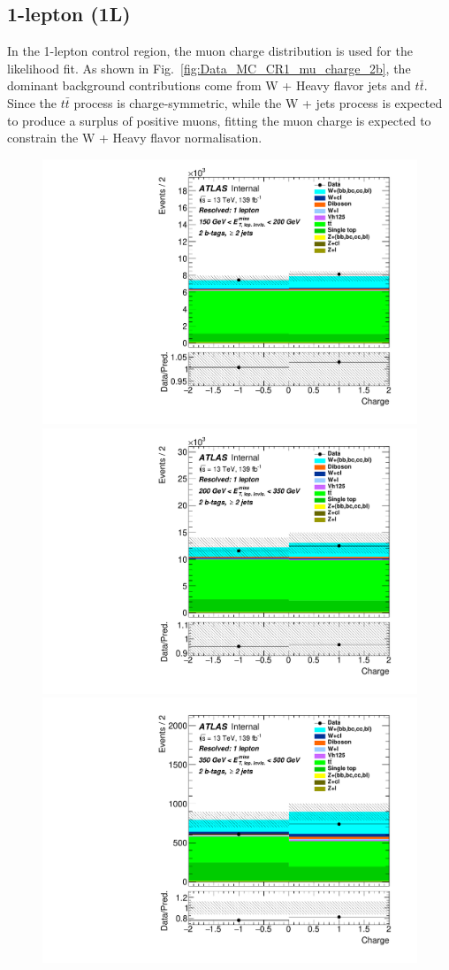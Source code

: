 \subsection{1-lepton (1L)}

\par In the 1-lepton control region, the muon charge distribution is used for the likelihood fit. As shown in Fig.~\ref{fig:Data_MC_CR1_mu_charge_2b}, the
dominant background contributions come from W + Heavy flavor jets and $t\bar{t}$. 
Since the $t\bar{t}$ process is charge-symmetric, while the W + jets process is expected to produce a surplus of positive muons, 
fitting the muon charge is expected to constrain the W + Heavy flavor normalisation.

\begin{figure}[H]
  \includegraphics[width=0.46\linewidth]{chapters/c9/figures/Region_distCharge_J2_L1_T2_DCR1_Y2015_incJet1_Fat0_incFat1_BMin150_BMax200_Prefit.pdf}
  \includegraphics[width=0.46\linewidth]{chapters/c9/figures/Region_distCharge_J2_L1_T2_DCR1_Y2015_incJet1_Fat0_incFat1_BMin200_BMax350_Prefit.pdf}\\
  \includegraphics[width=0.46\linewidth]{chapters/c9/figures/Region_distCharge_J2_L1_T2_DCR1_Y2015_incJet1_Fat0_incFat1_BMin350_BMax500_Prefit.pdf}

\end{figure}
